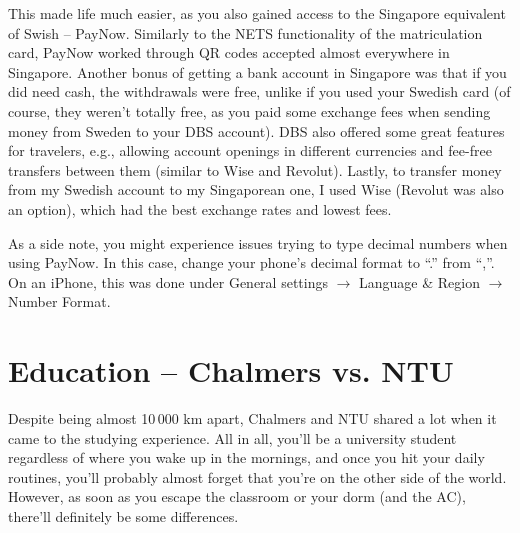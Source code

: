 This made life much easier, as you also gained access to the Singapore equivalent of Swish -- PayNow. Similarly to the NETS functionality of the matriculation card, PayNow worked through QR codes accepted almost everywhere in Singapore. Another bonus of getting a bank account in Singapore was that if you did need cash, the withdrawals were free, unlike if you used your Swedish card (of course, they weren't totally free, as you paid some exchange fees when sending money from Sweden to your DBS account). DBS also offered some great features for travelers, e.g., allowing account openings in different currencies and fee-free transfers between them (similar to Wise and Revolut). Lastly, to transfer money from my Swedish account to my Singaporean one, I used Wise (Revolut was also an option), which had the best exchange rates and lowest fees.

As a side note, you might experience issues trying to type decimal numbers when using PayNow. In this case, change your phone's decimal format to ``.'' from ``,''. On an iPhone, this was done under General settings $\rightarrow$ Language \& Region $\rightarrow$ Number Format. %
\section*{Education -- Chalmers vs. NTU}
{}
Despite being almost 10\,000 km apart, Chalmers and NTU shared a lot when it came to the studying experience. All in all, you'll be a university student regardless of where you wake up in the mornings, and once you hit your daily routines, you'll probably almost forget that you're on the other side of the world. However, as soon as you escape the classroom or your dorm (and the AC), there'll definitely be some differences.

